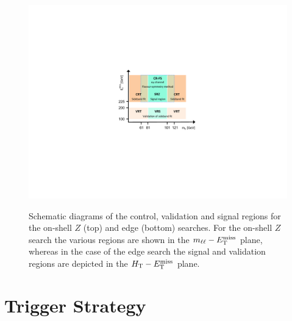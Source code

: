 \begin{figure}[h]
\centering
\includegraphics[width=.8\textwidth]{figures/fs/FSdiagram_v2.pdf}\\
\caption{
Schematic diagrams of the control, validation and signal regions for the on-shell $Z$ (top) and edge (bottom) searches.
For the on-shell $Z$ search the various regions are shown in the $m_{\ell\ell}-E_{\text{T}}^{\text{miss}}$ plane, whereas in the case of the edge search the
signal and validation regions are depicted in the $H_{\text{T}}-E_{\text{T}}^{\text{miss}}$ plane.
\label{fig:region_diagrams}
}
\end{figure}

\section{Trigger Strategy}
\label{sec:trig_strategy}

